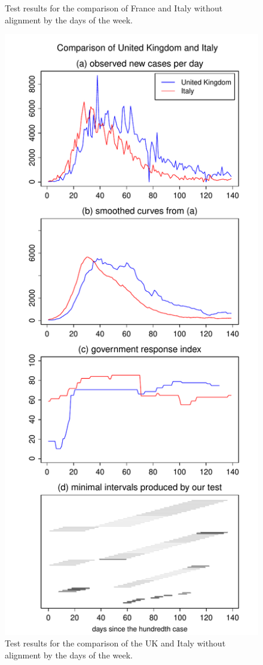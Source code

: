 \documentclass[a4paper,12pt]{article}
\numberwithin{equation}{section}
\begin{document}
\begin{figure}[h!]
\begin{minipage}[t]{0.49\textwidth}
\caption{Test results for the comparison of France and Italy without alignment by the days of the week.}
\end{minipage}
\hspace{0.25cm}
\begin{minipage}[t]{0.49\textwidth}
\includegraphics[width=\textwidth]{plots/GBR_vs_ITA}
\caption{Test results for the comparison of the UK and Italy without alignment by the days of the week.}
\end{minipage}
\end{figure}
\end{document}

